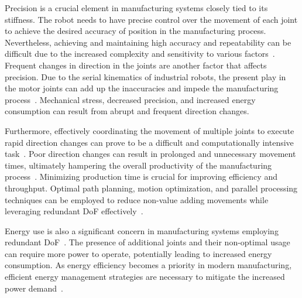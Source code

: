 Precision is a crucial element in manufacturing systems closely tied to its stiffness. The robot needs to have precise control over the movement of each joint to achieve the desired accuracy of position in the manufacturing process. Nevertheless, achieving and maintaining high accuracy and repeatability can be difficult due to the increased complexity and sensitivity to various factors~\cite{Duong.2021}. %
Frequent changes in direction in the joints are another factor that affects precision. 
Due to the serial kinematics of industrial robots, the present play in the motor joints can add up the inaccuracies and impede the manufacturing process~\cite{Huynh.2020, ChenGang.2014}. Mechanical stress, decreased precision, and increased energy consumption can result from abrupt and frequent direction changes.

Furthermore, effectively coordinating the movement of multiple joints to execute rapid direction changes can prove to be a difficult and computationally intensive task~\cite{VandeWeghe.2007}. Poor direction changes can result in prolonged and unnecessary movement times, ultimately hampering the overall productivity of the manufacturing process~\cite{Reiter.2016}. %
Minimizing production time is crucial for improving efficiency and throughput. Optimal path planning, motion optimization, and parallel processing techniques can be employed to reduce non-value adding movements while leveraging redundant DoF effectively~\cite{Boscariol.2020}.




Energy use is also a significant concern in manufacturing systems employing redundant DoF~\cite{Doan.2016}. The presence of additional joints and their non-optimal usage can require more power to operate, potentially leading to increased energy consumption. As energy efficiency becomes a priority in modern manufacturing, efficient energy management strategies are necessary to mitigate the increased power demand~\cite{Boscariol.2020, Boscariol.2019}. 


